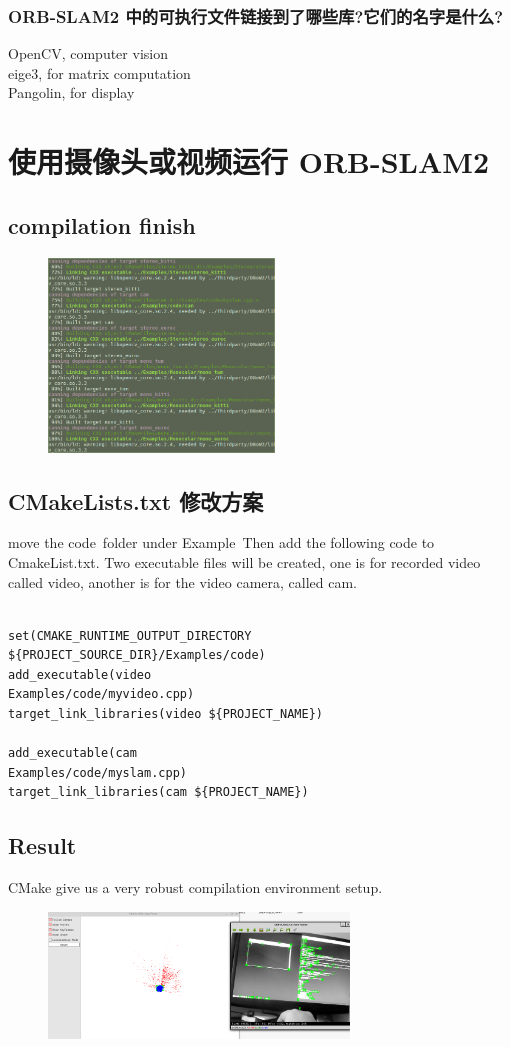 \documentclass{article}
\begin{document}
\begin{CJK*}{UTF8}{gbsn}
\subsubsection{ORB-SLAM2 中的可执行文件链接到了哪些库?它们的名字是什么?}
OpenCV, computer vision\\
eige3, for matrix computation\\
Pangolin, for display\\

\section{使用摄像头或视频运行 ORB-SLAM2}
\subsection{compilation finish}
\begin{figure}[h]
	\includegraphics[width=6cm]{compile.png}
	\centering
\end{figure}

\subsection{CMakeLists.txt 修改方案}
move the code\ folder under Example\ Then add the following code to CmakeList.txt. Two executable files will be created, one is for recorded video called video, another is for the video camera, called cam. 

\begin{lstlisting}

set(CMAKE_RUNTIME_OUTPUT_DIRECTORY ${PROJECT_SOURCE_DIR}/Examples/code)
add_executable(video
Examples/code/myvideo.cpp)
target_link_libraries(video ${PROJECT_NAME})

add_executable(cam
Examples/code/myslam.cpp)
target_link_libraries(cam ${PROJECT_NAME})

\end{lstlisting}

\subsection{Result}
CMake give us a very robust compilation environment setup. 
\begin{figure}[h]
	\includegraphics[width=8cm]{camerara.png}
	\centering
\end{figure}

\clearpage\end{CJK*}
\end{document}
